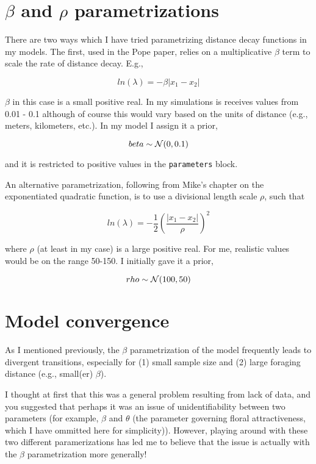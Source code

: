 \documentclass[12pt]{article}
\begin{document}
\section{$\beta$ and $\rho$ parametrizations}

There are two ways which I have tried parametrizing distance decay functions in my models. The first, used in the Pope paper, relies on a multiplicative $\beta$ term to scale the rate of distance decay. E.g.,

\[ln(\lambda) = -\beta |x_1 - x_2|\]

$\beta$ in this case is a small positive real. In my simulations is receives values from 0.01 - 0.1 although of course this would vary based on the units of distance (e.g., meters, kilometers, etc.). In my model I assign it a prior,

\[\\beta \sim \mathcal{N}(0, 0.1)\]

and it is restricted to positive values in the \texttt{parameters} block.

An alternative parametrization, following from Mike's chapter on the exponentiated quadratic function, is to use a divisional length scale $\rho$, such that

\[ln(\lambda) = -\frac{1}{2}\left(\frac{|x_1 - x_2|}{\rho}\right)^2\]

where $\rho$ (at least in my case) is a large positive real. For me, realistic values would be on the range 50-150. I initially gave it a prior,

\[\\rho \sim \mathcal{N}(100, 50)\]


\section{Model convergence}

As I mentioned previously, the $\beta$ parametrization of the model frequently leads to divergent transitions, especially for (1) small sample size and (2) large foraging distance (e.g., small(er) $\beta$).

I thought at first that this was a general problem resulting from lack of data, and you suggested that perhaps it was an issue of unidentifiability between two parameters (for example, $\beta$ and $\theta$ (the parameter governing floral attractiveness, which I have ommitted here for simplicity)). However, playing around with these two different paramerizations has led me to believe that the issue is actually with the $\beta$ parametrization more generally!
\end{document}
